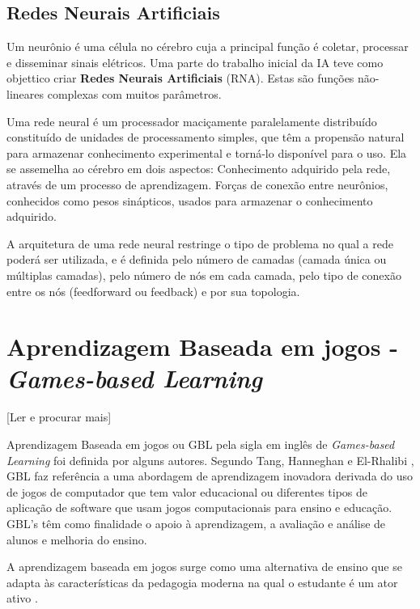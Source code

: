 \documentclass[
	12pt,				%
	openright,			%
	oneside,
	a4paper,			%
	english,			%
	french,				%
	spanish,			%
	brazil,				%
	]{abntex2}
\begin{document}

\subsection{Redes Neurais Artificiais}
\label{sec:RNA}
Um neurônio é uma célula no cérebro cuja a principal função é coletar, processar e disseminar sinais elétricos. Uma parte do trabalho inicial da IA teve como objettico criar \textbf{Redes Neurais Artificiais} (RNA). Estas são funções não-lineares complexas com muitos parâmetros. \cite{russell2004inteligencia}

Uma rede neural é um processador maciçamente paralelamente distribuído constituído de unidades de processamento simples, que têm a propensão natural para armazenar conhecimento experimental e torná-lo disponível para o uso. Ela se assemelha ao cérebro em dois aspectos: Conhecimento adquirido pela rede, através de um processo de aprendizagem. Forças de conexão entre neurônios, conhecidos como pesos sinápticos, usados para armazenar o conhecimento adquirido. \cite{haykin2001redes}

A arquitetura de uma rede neural restringe o tipo de problema no qual a rede poderá ser utilizada, e é definida pelo número de camadas (camada única ou múltiplas camadas), pelo número de nós em cada camada, pelo tipo de conexão entre os nós (feedforward ou feedback) e por sua topologia. \cite{haykin2001redes}

\section{Aprendizagem Baseada em jogos - \textit{Games-based Learning}}
\label{sec:GBL}
{\color{red}[Ler e procurar mais]}

Aprendizagem Baseada em jogos ou GBL pela sigla em inglês de \textit{Games-based Learning} foi definida por alguns autores. Segundo Tang, Hanneghan e El-Rhalibi \cite{tang2009introduction}, GBL faz referência a uma abordagem de aprendizagem inovadora derivada do uso de jogos de computador que tem valor educacional ou diferentes tipos de aplicação de software que usam jogos computacionais para ensino e educação. GBL's têm como finalidade o apoio à aprendizagem, a avaliação e análise de alunos e melhoria do ensino.

A aprendizagem baseada em jogos surge como uma alternativa de ensino que se adapta às características da pedagogia moderna na qual o estudante é um ator ativo \cite{monsalve2014aprendizagem}.
\end{document}

